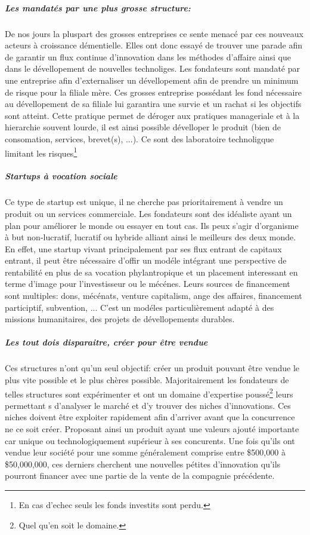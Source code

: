 \documentclass[11pt, a4paper ]{article}
\begin{document}
\begin{spacing}{1.5}
			\subparagraph{Les mandatés par une plus grosse structure:} %
De nos jours la pluspart des grosses entreprises ce sente menacé par ces nouveaux acteurs à croissance démentielle. Elles ont donc essayé de trouver une parade afin de garantir un flux continue d'innovation dans les méthodes d'affaire ainsi que dans le dévellopement de nouvelles technoliges. Les fondateurs sont mandaté par une entreprise afin d'externaliser un dévellopement afin de prendre un minimum de risque pour la filiale mère. Ces grosses entreprise possédant les fond nécessaire au dévellopement de sa filiale lui garantira une survie et un rachat si les objectifs sont atteint. Cette pratique permet de déroger aux pratiques manageriale et à la hierarchie souvent lourde, il est ainsi possible dévelloper le produit (bien de consomation, services, brevet(s), ...). Ce sont des laboratoire technoligque limitant les risques\footnote{En cas d'echec seuls les fonds investits sont perdu.}

			\subparagraph{Startups à vocation sociale} %
Ce type de startup est unique, il ne cherche pas prioritairement à vendre un produit ou un services commerciale. Les fondateurs sont des idéaliste ayant un plan pour améliorer le monde ou essayer en tout cas.
Ils peux s'agir d'organisme à but non-lucratif, lucratif ou hybride alliant ainsi le meilleurs des deux monde.
En effet, une startup vivant principalement par ses flux entrant de capitaux entrant, il peut être nécessaire d'offir un modéle intégrant une perspective de rentabilité en plus de sa vocation phylantropique et un placement interessant en terme d'image pour l'investisseur ou le mécénes. Leurs sources de financement sont  multiples: dons, mécénats, venture capitalism, ange des affaires, financement participtif, subvention, ...
C'est un modéles particulièrement adapté à des missions humanitaires, des projets de dévellopements durables.


			\subparagraph{Les \emph{tout dois disparaitre}, créer pour être vendue} %
Ces structures n'ont qu'un seul objectif: créer un produit pouvant être vendue le plus vite possible et le plus chères possible. Majoritairement les fondateurs de telles structures sont expérimenter et ont un domaine d'expertise poussé\footnote{Quel qu'en soit le domaine.} leurs permettant s d'analyser le marché et d'y trouver des niches d'innovations. Ces niches doivent être exploiter rapidement afin d'arriver avant que la concurrence ne ce soit créer. Proposant ainsi un produit ayant une valeurs ajouté importante car unique ou technologiquement supérieur à ses concurents. Une fois qu'ils ont vendue leur société pour une somme généralement comprise entre \$500,000 à \$50,000,000, ces derniers cherchent une nouvelles pétites d'innovation qu'ils pourront financer avec une partie de la vente de la compagnie précédente.


\end{spacing}
\end{document}

